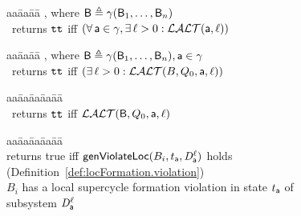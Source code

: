 \begin{figure}[ht]

\setcounter{lctr}{0}
\begin{tabbing}\label{alg:check.LAO}
aa\= aa\= aa\= \kill
{},  where $\mathsf{B} \triangleq \gamma(\mathsf{B}_1,\dots,\mathsf{B}_n)$\\
\cmnt\ returns $\textup{\texttt{tt}}$ iff $(\forall\, \mathsf{a} \in \gamma, \exists\, \ell > 0: \mathcal{LALT}(\mathsf{a}, \ell))$\\
\lio{\ENDFOR;}
\end{tabbing}

\setcounter{lctr}{0}
\begin{tabbing}\label{alg:check.LAO.Int}
aa\= aa\= aa\= \kill
{},  where $\mathsf{B} \triangleq \gamma(\mathsf{B}_1,\dots,\mathsf{B}_n), \mathsf{a} \in \gamma$\\
\cmnt\ returns $\textup{\texttt{tt}}$ iff $(\exists\, \ell > 0: \mathcal{LALT}(B, Q_0, \mathsf{a}, \ell))$\\
\lio{\WHILEC{\ttt}}
\lion{\ENDWHILE}
\end{tabbing}

\setcounter{lctr}{0}
\begin{tabbing}
\label{alg:eval-ldfc}
aa\= aa\= aa\= aa\= aa\=\kill
{}\\
\cmnt\ returns $\textup{\texttt{tt}}$ iff $\mathcal{LALT}(\mathsf{B}, Q_0, \mathsf{a}, \ell)$\\
   \lit{\ENDFOR}
\lio{\ENDFOR;}
\end{tabbing}



\setcounter{lctr}{0}
\begin{tabbing}
\label{alg:computeLocForm}
aa\= aa\= aa\= aa\= aa\=\kill
{}\\
\cmnt returns true iff $\mathsf{genViolateLoc}(B_i,t_{\mathsf{a}},\mathit{D}_{\mathsf{a}}^{\ell})$ holds (Definition~\ref{def:locFormation.violation})\\
\cmnt \ie $B_i$ has a local supercycle formation violation in state $t_{\mathsf{a}}$ of subsystem $\mathit{D}_{\mathsf{a}}^{\ell}$\\
\end{tabbing}



\end{figure}

